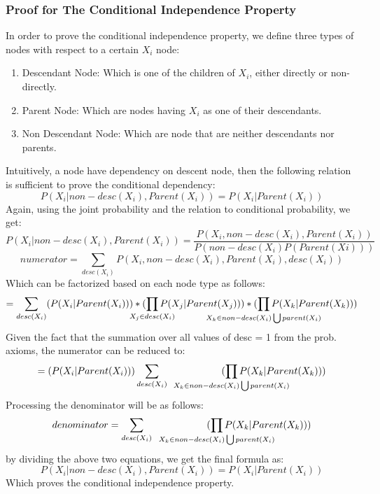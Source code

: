 \documentclass{article}
\begin{document}
\subsubsection{Proof for The Conditional Independence Property}
In order to prove the conditional independence property, we define three types of nodes with respect to a certain $X_i$ node:
\begin{enumerate}
\item Descendant Node: Which is one of the children of $X_i$, either directly or non-directly.
\item Parent Node: Which are nodes having $X_i$ as one of their descendants.
\item Non Descendant Node: Which are node that are neither descendants nor parents.
\end{enumerate}
Intuitively, a node have dependency on descent node, then the following relation is sufficient to prove the conditional dependency:
\begin{equation}
P(X_i|non-desc(X_i),Parent(X_i)) = P(X_i|Parent(X_i)) 
\end{equation} 
Again, using the joint probability and the relation to conditional probability, we get:
\begin{equation}
P(X_i|non-desc(X_i),Parent(X_i)) = \frac{P(X_i, non-desc(X_i), Parent(X_i))}{P(non-desc(X_i)P(Parent(Xi)))}
\end{equation}
\begin{equation}
numerator = \sum_{desc(X_i)} P(X_i, non-desc(X_i), Parent(X_i), desc(X_i))
\end{equation}
Which can be factorized based on each node type as follows:
\begin{equation}
= \sum_{desc(X_i)} (P(X_i|Parent(X_i)))*(\prod_{\mathclap{X_j \in desc(X_i)}} P(X_j|Parent(X_j)))*(\prod_{\mathclap{X_k \in {non-desc(X_i) \bigcup parent(X_i)}}} P(X_k|Parent(X_k)))
\end{equation}
Given the fact that the summation over all values of desc = 1 from the prob. axioms, the numerator can be reduced to:
\begin{equation}
= (P(X_i|Parent(X_i))) \sum_{desc(X_i)}\;\;\;\;\;\;\;\;\;\;\;\;\;\;\;\;\;\;\;\;(\prod_{\mathclap{X_k \in {non-desc(X_i) \bigcup parent(X_i)}}} P(X_k|Parent(X_k)))
\end{equation}
Processing the denominator will be as follows:
\begin{equation}
denominator = \sum_{desc(X_i)}\;\;\;\;\;\;\;\;\;\;\;\;\;\;\;\;\;\;\;\ (\prod_{\mathclap{X_k \in {non-desc(X_i) \bigcup parent(X_i)}}} P(X_k|Parent(X_k)))
\end{equation}  
by dividing the above two equations, we get the final formula as:
\begin{equation}
P(X_i|non-desc(X_i),Parent(X_i)) = P(X_i|Parent(X_i)) 
\end{equation} 
Which proves the conditional independence property.
\end{document}
